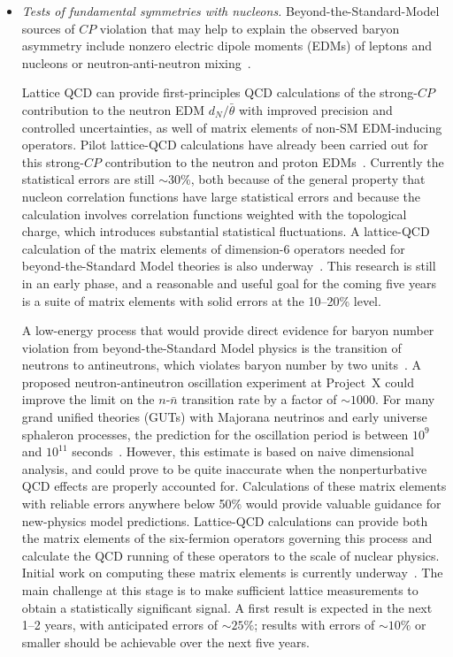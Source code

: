 \begin{itemize}
\item {\it Tests of fundamental symmetries with nucleons.}  Beyond-the-Standard-Model sources of $CP$ violation that may help to explain the observed baryon asymmetry include nonzero electric dipole moments (EDMs) of leptons and nucleons \cite{Pospelov:2005pr} or neutron-anti-neutron mixing~\cite{Mohapatra:1980qe}.

Lattice QCD can provide first-principles QCD calculations of the strong-$CP$ contribution to the neutron EDM
$d_N/\bar{\theta}$ with improved precision and controlled uncertainties, as well of matrix elements of non-SM
EDM-inducing operators.
Pilot lattice-QCD calculations have already been carried out for this strong-$CP$ contribution to the neutron
and proton EDMs~\cite{Shintani:2008nt,Shintani:2005xg,Aoki:2008gv}.
Currently the statistical errors are still $\sim$30\%, both because of the general property that nucleon
correlation functions have large statistical errors and because the calculation involves correlation functions weighted with the topological charge, which introduces substantial statistical fluctuations.
A lattice-QCD calculation of the matrix elements of dimension-6 operators needed for beyond-the-Standard Model theories is also
underway~\cite{Bhattacharya:2012bf}. This research is still in an early phase, and a reasonable and useful goal for the coming five years is a suite of matrix elements with solid errors at the 10--20\% level.

A low-energy process that would provide direct evidence for baryon number violation from beyond-the-Standard Model physics is the
transition of neutrons to antineutrons, which violates baryon number by two units~\cite{Mohapatra:1980qe}.
A proposed neutron-antineutron oscillation experiment at Project~X could improve the limit on the
$n$-$\bar{n}$ transition rate by a factor of $\sim 1000$.
For many grand unified theories (GUTs) with Majorana neutrinos and early universe sphaleron processes, the
prediction for the oscillation period is between $10^9$ and $10^{11}$ seconds~\cite{Nussinov:2001rb,%
Babu:2008rq,Mohapatra:2009wp,Winslow:2010wf,Babu:2012vc}.
However, this estimate is based on naive dimensional analysis, and could prove to be quite inaccurate when
the nonperturbative QCD effects are properly accounted for.
Calculations of these matrix elements with reliable errors anywhere below 50\% would provide valuable
guidance for new-physics model predictions.
Lattice-QCD calculations can provide both the matrix elements of the six-fermion operators governing this
process and calculate the QCD running of these operators to the scale of nuclear physics.
Initial work on computing these matrix elements is currently underway~\cite{Buchoff:2012bm}.
The main challenge at this stage is to make sufficient lattice measurements to obtain a statistically
significant signal. A first result is expected in the next 1--2 years, with anticipated errors of $\sim 25\%$; results with errors of $\sim 10\%$ or smaller should be achievable over the next five years.

\end{itemize}

